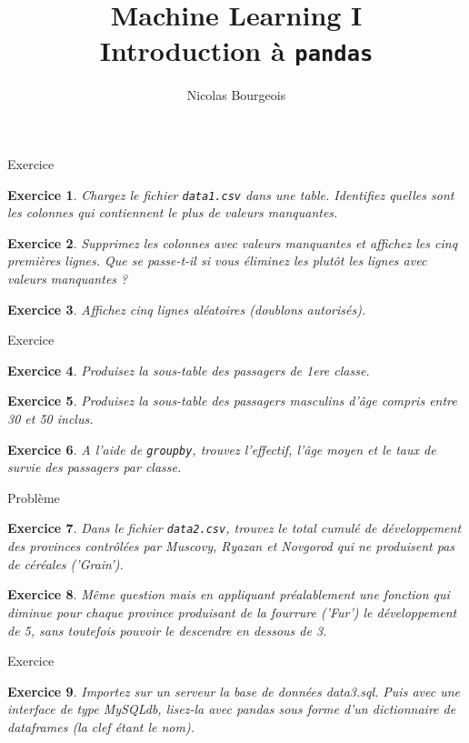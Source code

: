 \documentclass[11pt]{beamer}
\title{Machine Learning I \\ Introduction à \texttt{pandas}}
\author{Nicolas Bourgeois}
\date{}
\newtheorem{exercice}{Exercice}
\begin{document}
\begin{frame}{Exercice}
\begin{exercice}
Chargez le fichier \texttt{data1.csv} dans une table. Identifiez quelles sont les colonnes qui contiennent le plus de valeurs manquantes.
\end{exercice}

\begin{exercice}
Supprimez les colonnes avec valeurs manquantes et affichez les cinq premières lignes. Que se passe-t-il si vous éliminez les plutôt les lignes avec valeurs manquantes ?
\end{exercice}

\begin{exercice}
Affichez cinq lignes aléatoires (doublons autorisés).
\end{exercice}
\end{frame}


\begin{frame}{Exercice}
\begin{exercice}
Produisez la sous-table des passagers de 1ere classe.
\end{exercice}
\begin{exercice}
Produisez la sous-table des passagers masculins d'âge compris entre 30 et 50 inclus.
\end{exercice}
\begin{exercice}
A l'aide de \texttt{groupby}, trouvez l'effectif, l'âge moyen et le taux de survie des passagers par classe.
\end{exercice}
\end{frame}



\begin{frame}{Problème}
\begin{exercice}
Dans le fichier \texttt{data2.csv}, trouvez le total cumulé de développement des provinces contrôlées par Muscovy, Ryazan et Novgorod qui ne produisent pas de céréales ('Grain').
\end{exercice}
\begin{exercice}
Même question mais en appliquant préalablement une fonction qui diminue pour chaque province produisant de la fourrure ('Fur') le développement de 5, sans toutefois pouvoir le descendre en dessous de 3.
\end{exercice}
\end{frame}


\begin{frame}{Exercice}
\begin{exercice}
Importez sur un serveur la base de données data3.sql. Puis avec une interface de type MySQLdb, lisez-la avec pandas sous forme d'un dictionnaire de dataframes (la clef étant le nom).
\end{exercice}
\end{frame}
\end{document}
